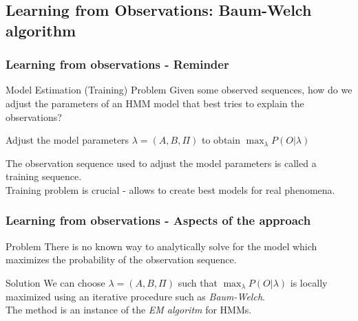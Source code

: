 \subsection[Baum-Welch algorithm]{Learning from Observations:
  Baum-Welch algorithm}
\label{sec:bw}

\begin{frame}[t]
	\frametitle{Learning from observations - Reminder}
	\begin{block}{Model Estimation (Training) Problem}
    	Given some observed sequences, how do we adjust the \alert{parameters} of an HMM model that best tries 	
    	to explain the observations?
  	\end{block}
  	\pause
  	
  	\begin{block}{}
  		Adjust the model parameters $\lambda = (A, B, \Pi)$ to obtain $\max_{\lambda} P(O \vert \lambda)$
  	\end{block}
  	\pause
  	
  	\begin{block}{}
  		The observation sequence used to adjust the model parameters is called a \alert{training} sequence.\\
  		Training problem is crucial - allows to create best models for real phenomena.
  	\end{block}
\end{frame}


\begin{frame}[t]
	\frametitle{Learning from observations - Aspects of the approach}
	\pause
		
	\begin{block}{\alert{Problem}}
    	There is no known way to analytically solve for the model which maximizes the probability of the
    	observation sequence.
  	\end{block}
  	\pause
  	
  	\begin{block}{Solution}
  		We can choose $\lambda = (A, B, \Pi)$ such that $\max_{\lambda} P(O \vert \lambda)$ is 
  		\alert{locally maximized} using an \alert{iterative procedure} such as \emph{Baum-Welch}.\\
  		The method is an instance of the \emph{EM algoritm} \citep{dempster1977maximum} for HMMs.
  	\end{block}
  	
\end{frame}

